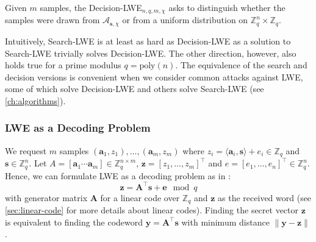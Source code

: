 \begin{definition}
    Given $m$ samples, the Decision-LWE$_{n, q, m, \chi}$ asks to distinguish whether the samples were drawn from $\mathcal{A}_{\mathbf{s}, \chi}$ or from a uniform distribution on $\mathbb{Z}_q^n \times \mathbb{Z}_q$.
\end{definition}

Intuitively, Search-LWE is at least as hard as Decision-LWE as a solution to Search-LWE trivially solves Decision-LWE. The other direction, however, also holds true \cite{Reg09} for a prime modulus $q=\text{poly}(n)$. %
The equivalence of the search and decision versions is convenient when we consider common attacks against LWE, some of which solve Decision-LWE and others solve Search-LWE (see \cref{ch:algorithms}).

% 


\subsubsection{LWE as a Decoding Problem} \label{sec:lwe-decoding}
We request $m$ samples $(\mathbf{a}_1, z_1), \ldots, (\mathbf{a}_m, z_m)$ where $z_i = \langle \mathbf{a}_i, \mathbf{s} \rangle + e_i \in \mathbb{Z}_q$ and $\mathbf{s} \in \mathbb{Z}_q^n$. Let $A = \left[ \mathbf{a}_1 \cdots \mathbf{a}_m\right] \in \mathbb{Z}_q^{n\times m}$, $\mathbf{z} = \left[z_1, \ldots, z_m\right]^\intercal$ and $e = \left[e_1, \ldots, e_n\right]^\intercal \in \mathbb{Z}_q^n$. Hence, we can formulate LWE as a decoding problem as in \cite{GJS15}:
\begin{equation} \label{eq:lwe-decoding}
    \mathbf{z} =  \mathbf{A}^\intercal \mathbf{s} + \mathbf{e} \mod q
\end{equation}
with generator matrix $\mathbf{A}$ for a linear code over $\mathbb{Z}_q$ and $\mathbf{z}$ as the received word (see \cref{sec:linear-code} for more details about linear codes). Finding the secret vector $\mathbf{z}$ is equivalent to finding the codeword $\mathbf{y} = \mathbf{A}^\intercal\mathbf{s}$ with minimum distance $\| \mathbf{y} - \mathbf{z} \|$.

